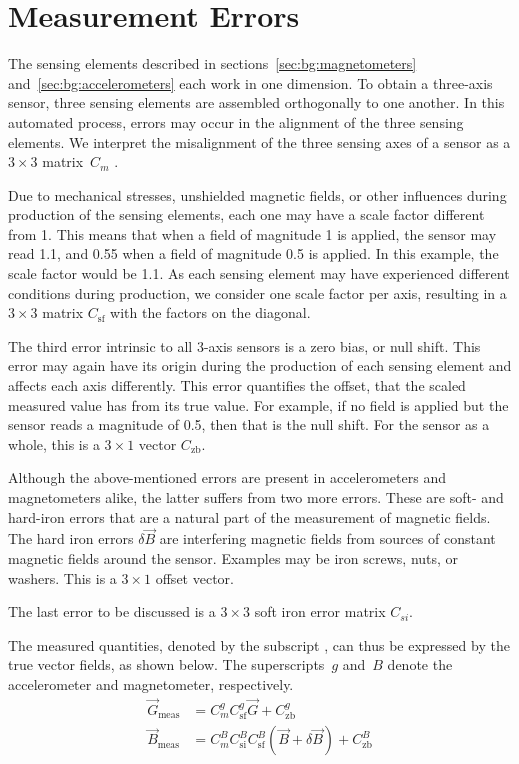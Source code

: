 \section{Measurement Errors \label{sec:bg:measurement_errors}}
The sensing elements described in sections~\ref{sec:bg:magnetometers} and~\ref{sec:bg:accelerometers} each work in one dimension. To obtain a three-axis sensor, three sensing elements are assembled orthogonally to one another. In this automated process, errors may occur in the alignment of the three sensing elements. We interpret the misalignment of the three sensing axes of a sensor as a $3\times3$ matrix~$C_{m}$ \parencite{magcal}\parencite{non-orthonogality}.

Due to mechanical stresses, unshielded magnetic fields, or other influences during production of the sensing elements, each one may have a scale factor different from 1. This means that when a field of magnitude 1 is applied, the sensor may read 1.1, and 0.55 when a field of magnitude 0.5 is applied. In this example, the scale factor would be 1.1. As each sensing element may have experienced different conditions during production, we consider one scale factor per axis, resulting in a $3\times3$ matrix $C_{\mathrm{sf}}$ with the factors on the diagonal.

The third error intrinsic to all 3-axis sensors is a zero bias, or null shift. This error may again have its origin during the production of each sensing element and affects each axis differently. This error quantifies the offset, that the scaled measured value has from its true value. For example, if no field is applied but the sensor reads a magnitude of 0.5, then that is the null shift. For the sensor as a whole, this is a $3\times1$ vector $C_{\mathrm{zb}}$.

Although the above-mentioned errors are present in accelerometers and magnetometers alike, the latter suffers from two more errors. These are soft- and hard-iron errors that are a natural part of the measurement of magnetic fields.\\
The hard iron errors $\delta\vec{B}$ are interfering magnetic fields from sources of constant magnetic fields around the sensor. Examples may be iron screws, nuts, or washers. This is a $3\times1$ offset vector.

The last error to be discussed is a $3\times3$ soft iron error matrix $C_{si}$.

The measured quantities, denoted by the subscript , can thus be expressed by the true vector fields, as shown below. The superscripts~$g$ and~$B$ denote the accelerometer and magnetometer, respectively.
\begin{align}
    \vec{G}_{\mathrm{meas}}&=C^g_mC^g_{\mathrm{sf}}\vec G+C_{\mathrm{zb}}^g \label{eq:bg:g_with_errors}\\
    \vec{B}_{\mathrm{meas}}&=C^B_mC^B_{\mathrm{si}}C^B_{\mathrm{sf}}(\vec{B}+\delta\vec{B})+C_{\mathrm{zb}}^B
    \label{eq:bg:b_with_errors}
\end{align}

